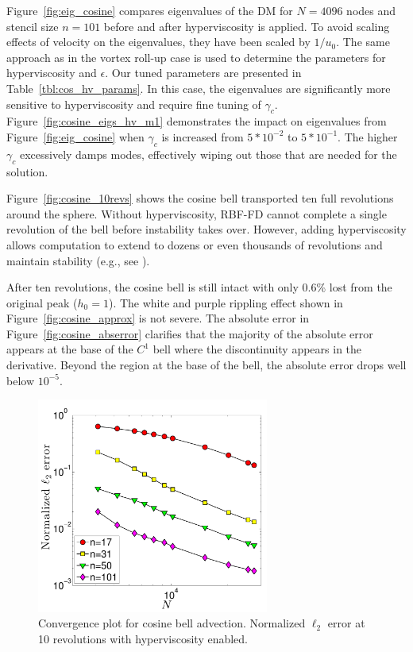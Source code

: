 \documentclass{report}
\begin{document}
Figure~\ref{fig:eig_cosine} compares eigenvalues of the DM for $N=4096$ nodes and stencil size $n=101$ before and after hyperviscosity is applied. To avoid scaling effects of velocity on the eigenvalues, they have been scaled by $1/u_0$.  The same approach as in the vortex roll-up case is used to determine the parameters for hyperviscosity and $\epsilon$. Our tuned parameters are presented in 
Table~\ref{tbl:cos_hv_params}. In this case, the eigenvalues are significantly more sensitive to hyperviscosity and require fine tuning of $\gamma_c$. Figure~\ref{fig:cosine_eigs_hv_m1} demonstrates the impact on eigenvalues from Figure~\ref{fig:eig_cosine} when $\gamma_c$ is increased from $5*10^{-2}$ to $5*10^{-1}$. The higher $\gamma_c$ excessively damps modes, effectively wiping out those that are needed for the solution. 


Figure~\ref{fig:cosine_10revs} shows the cosine bell transported ten full revolutions around the sphere. Without hyperviscosity, RBF-FD cannot complete a single revolution of the bell before instability takes over. However, adding hyperviscosity allows computation to extend to dozens or even thousands of revolutions and maintain stability (e.g., see \cite{FornbergLehto11}). 

After ten revolutions, the cosine bell is still intact with only 0.6\% lost from the original peak ($h_0=1$). The white and purple rippling effect shown in Figure~\ref{fig:cosine_approx} is not severe. The absolute error in Figure~\ref{fig:cosine_abserror} clarifies that the majority of the absolute error appears at the base of the $C^1$ bell where the discontinuity appears in the derivative. Beyond the region at the base of the bell, the absolute error drops well below $10^{-5}$. 


\begin{figure}
\begin{center}
\includegraphics[width=3in]{../figures/paper1/cosine_bell/convergence_plot_hv-eps-converted-to.pdf}
\caption{Convergence plot for cosine bell advection. Normalized $\ell_2$ error at 10 revolutions with hyperviscosity enabled. }
\label{fig:conv_cosine_bell}
\end{center}
\end{figure}
\end{document}
